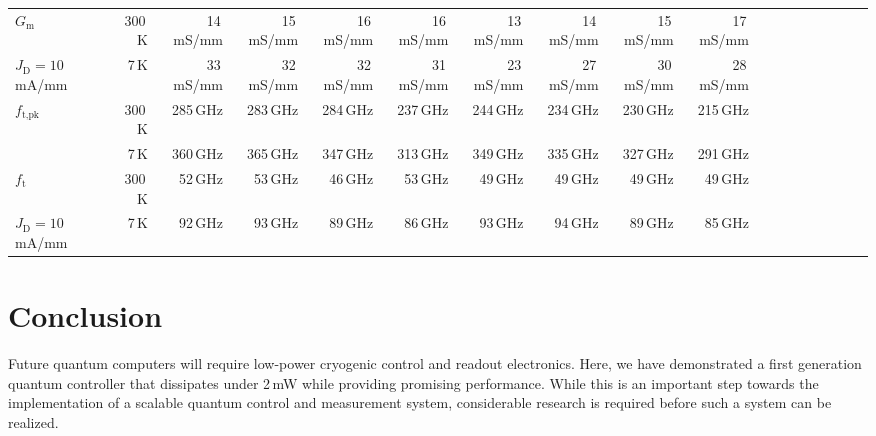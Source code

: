 \documentclass[journal]{IEEEtran}
\newcommand{\CR}[1]{{\color{black}#1}}
\begin{document}
\begin{table}[bt!]
\begin{center}
\begin{tabular}{lrrrrrrrrrrrrrrrrr}
$G_\text{m}$&300\,K&14\,mS/mm&15\,mS/mm&16\,mS/mm&16\,mS/mm&13\,mS/mm&14\,mS/mm&15\,mS/mm&17\,mS/mm\\
$J_\text{D}=10$\,mA/mm&7\,K&33\,mS/mm&32\,mS/mm&32\,mS/mm&31\,mS/mm&23\,mS/mm&27\,mS/mm&30\,mS/mm&28\,mS/mm\\
\midrule
$f_\text{t,pk}$&300\,K&285\,GHz&283\,GHz&284\,GHz&237\,GHz&244\,GHz&234\,GHz&230\,GHz&215\,GHz\\
&7\,K&360\,GHz&365\,GHz&347\,GHz&313\,GHz&349\,GHz&335\,GHz&327\,GHz&291\,GHz\\
\midrule
$f_\text{t}$&300\,K&52\,GHz&53\,GHz&46\,GHz&53\,GHz&49\,GHz&49\,GHz&49\,GHz&49\,GHz\\
$J_\text{D}=10$\,mA/mm&7\,K&92\,GHz&93\,GHz&89\,GHz&86\,GHz&93\,GHz&94\,GHz&89\,GHz&85\,GHz\\
\bottomrule
\end{tabular}
\end{center}
\end{table}
\section{Conclusion}
Future quantum computers will require low-power cryogenic control and readout electronics. Here, we have demonstrated a first generation quantum controller that dissipates under 2\,mW while providing \CR{promising} performance. While this is an important step towards the implementation of a scalable quantum control and measurement system, considerable research is required before such a system can be realized. 
\end{document}
